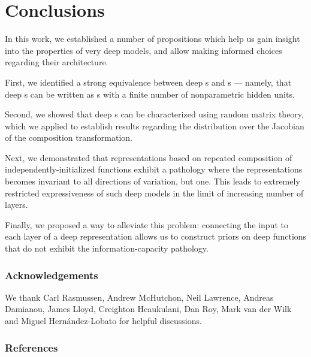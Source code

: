 \documentclass[twoside]{article}
\makeatletter
\newlength{\nonHumbleHeight}
\def\@humbleformat#1{{\settoheight{\nonHumbleHeight}{#1}\resizebox{!}{0.94\nonHumbleHeight}{#1}}}%
\newcommand\humble[1]{{\@humbleformat{#1}}}%
\newcommand{\gp}{{\humble{GP}}}
\newcommand{\MLP}{{\humble{MLP}}}
\newcommand{\sectiondist}{}
\makeatother
\begin{document}







\section{Conclusions}
\sectiondist

In this work, we established a number of propositions which help us gain insight into the properties of very deep models, and allow making informed choices regarding their architecture.

First, we identified a strong equivalence between deep \gp{}s and \MLP{}s --- namely, that deep \gp{}s can be written as \MLP{}s with a finite number of nonparametric hidden units. 

Second, we showed that deep \gp{}s can be characterized using random matrix theory, which we applied to establish results regarding the distribution over the Jacobian of the composition transformation.

Next, we demonstrated that representations based on repeated composition of independently-initialized functions exhibit a pathology where the representations becomes invariant to all directions of variation, but one. This leads to extremely restricted expressiveness of such deep models in the limit of increasing number of layers. 

Finally, we proposed a way to alleviate this problem: connecting the input to each layer of a deep representation allows us to construct priors on deep functions that do not exhibit the information-capacity pathology.


\subsubsection*{Acknowledgements}
We thank Carl Rasmussen, Andrew McHutchon, Neil Lawrence, Andreas Damianou, James Lloyd, Creighton Heaukulani, Dan Roy, Mark van der Wilk and Miguel Hern\'{a}ndez-Lobato for helpful discussions.

\subsubsection*{References}
\vspace{-0.3in}
\renewcommand{\refname}{}



\end{document}
